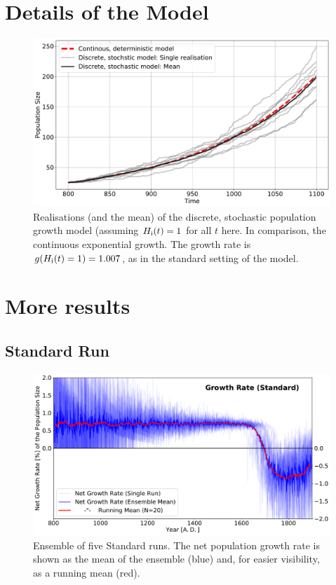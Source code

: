 
\chapter{Details of the Model} \label{sec:APPpopgrowth}

\begin{figure}
	\centering
	\includegraphics[width=\textwidth]{images/RealisationsOfPopGrowth.pdf}
	\caption{Realisations (and the mean) of the discrete, stochastic population growth model (assuming $H_{\rm i}(t) = 1$ for all $t$ here. In comparison, the continuous exponential growth. The growth rate is $g(H_{\rm i}(t)=1)=1.007$, as in the standard setting of the model.}
	\label{fig:realisationsofpopgrowth}
\end{figure}


\chapter{More results}
\section{Standard Run}
\begin{figure}
	\centering
	\includegraphics[width=1.0\linewidth]{images/Results/Standard/NetGrowthRate}
	\caption{Ensemble of five Standard runs. The net population growth rate is shown as the mean of the ensemble (blue) and, for easier visibility, as a running mean (red).} 
	\label{fig:app:STDnetgrowthrate}
\end{figure}
